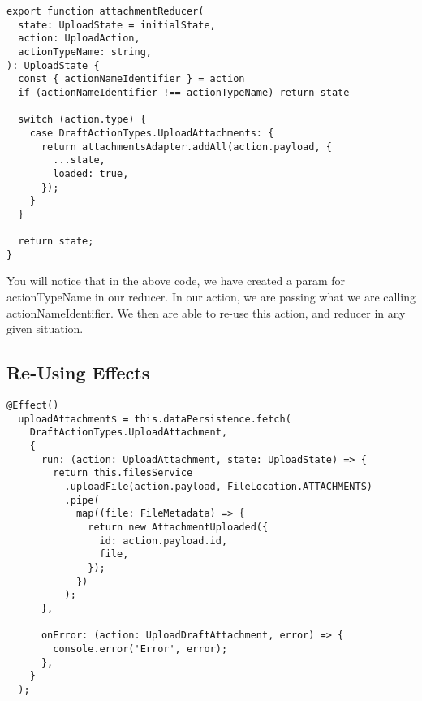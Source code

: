 \begin{lstlisting}
export function attachmentReducer(
  state: UploadState = initialState,
  action: UploadAction,
  actionTypeName: string,
): UploadState {
  const { actionNameIdentifier } = action
  if (actionNameIdentifier !== actionTypeName) return state

  switch (action.type) {
    case DraftActionTypes.UploadAttachments: {
      return attachmentsAdapter.addAll(action.payload, {
        ...state,
        loaded: true,
      });
    }
  }

  return state;
}
\end{lstlisting}

You will notice that in the above code, we have created a param for
actionTypeName in our reducer. In our action, we are passing what we are calling
actionNameIdentifier. We then are able to re-use this action, and reducer in any
given situation.

\subsection{Re-Using Effects}
\begin{lstlisting}
@Effect()
  uploadAttachment$ = this.dataPersistence.fetch(
    DraftActionTypes.UploadAttachment,
    {
      run: (action: UploadAttachment, state: UploadState) => {
        return this.filesService
          .uploadFile(action.payload, FileLocation.ATTACHMENTS)
          .pipe(
            map((file: FileMetadata) => {
              return new AttachmentUploaded({
                id: action.payload.id,
                file,
              });
            })
          );
      },

      onError: (action: UploadDraftAttachment, error) => {
        console.error('Error', error);
      },
    }
  );
\end{lstlisting}
